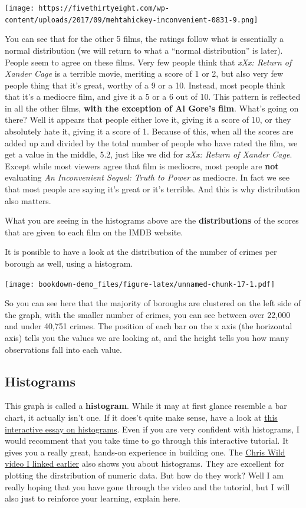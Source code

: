 \documentclass[
]{book}
\begin{document}
\texttt{[image: https://fivethirtyeight.com/wp-content/uploads/2017/09/mehtahickey-inconvenient-0831-9.png]}

You can see that for the other 5 films, the ratings follow what is essentially a normal distribution (we will return to what a ``normal distribution'' is later). People seem to agree on these films. Very few people think that \emph{xXx: Return of Xander Cage} is a terrible movie, meriting a score of 1 or 2, but also very few people thing that it's great, worthy of a 9 or a 10. Instead, most people think that it's a mediocre film, and give it a 5 or a 6 out of 10. This pattern is reflected in all the other films, \textbf{with the exception of Al Gore's film}. What's going on there? Well it appears that people either love it, giving it a score of 10, or they absolutely hate it, giving it a score of 1. Because of this, when all the scores are added up and divided by the total number of people who have rated the film, we get a value in the middle, 5.2, just like we did for \emph{xXx: Return of Xander Cage}. Except while most viewers agree that film is mediocre, most people are \textbf{not} evaluating \emph{An Inconvenient Sequel: Truth to Power} as mediocre. In fact we see that most people are saying it's great or it's terrible. And this is why distribution also matters.

What you are seeing in the histograms above are the \textbf{distributions} of the scores that are given to each film on the IMDB website.

It is possible to have a look at the distribution of the number of crimes per borough as well, using a histogram.

\texttt{[image: bookdown-demo\_files/figure-latex/unnamed-chunk-17-1.pdf]}

So you can see here that the majority of boroughs are clustered on the left side of the graph, with the smaller number of crimes, you can see between over 22,000 and under 40,751 crimes. The position of each bar on the x axis (the horizontal axis) tells you the values we are looking at, and the height tells you how many observations fall into each value.

\hypertarget{histograms}{%
\subsection{Histograms}\label{histograms}}

This graph is called a \textbf{histogram}. While it may at first glance resemble a bar chart, it actually isn't one. If it does't quite make sense, have a look at
\href{http://tinlizzie.org/histograms/}{this interactive essay on histograms}. Even if you are very confident with histograms, I would recomment that you take time to go through this interactive tutorial. It gives you a really great, hands-on experience in building one. The \href{https://www.youtube.com/watch?v=U3lk2nQYfAQ\&amp=\&list=PL8CRAVedURQrlxeFfme0TEgaj1_h67JUR\&amp=\&index=4}{Chris Wild video I linked earlier} also shows you about histograms. They are excellent for plotting the dirstribution of numeric data. But how do they work? Well I am really hoping that you have gone through the video and the tutorial, but I will also just to reinforce your learning, explain here.
\end{document}
